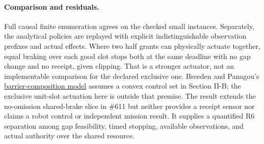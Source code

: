 \documentclass{article}
\begin{document}
\paragraph{Comparison and residuals.}
Full causal finite enumeration agrees on the checked
small instances. Separately, the analytical policies are
replayed with explicit indistinguishable observation
prefixes and actual effects. Where two half grants can
physically actuate together, equal braking over each
good slot stops both at the same deadline with no gap
change and no receipt, given clipping. That is a stronger
actuator, not an implementable comparison for the
declared exclusive one. Breeden and Panagou's
\href{https://arxiv.org/html/2210.01354v2}{barrier-composition model}
assumes a convex control set in Section II-B; the
exclusive unit-slot actuation here is outside that
premise. The result extends the no-omission shared-brake
slice in \#611 but neither provides a receipt sensor
nor claims a robot control or independent mission
result. It supplies a quantified R6 separation among
gap feasibility, timed stopping, available observations,
and actual authority over the shared resource.
\end{document}
